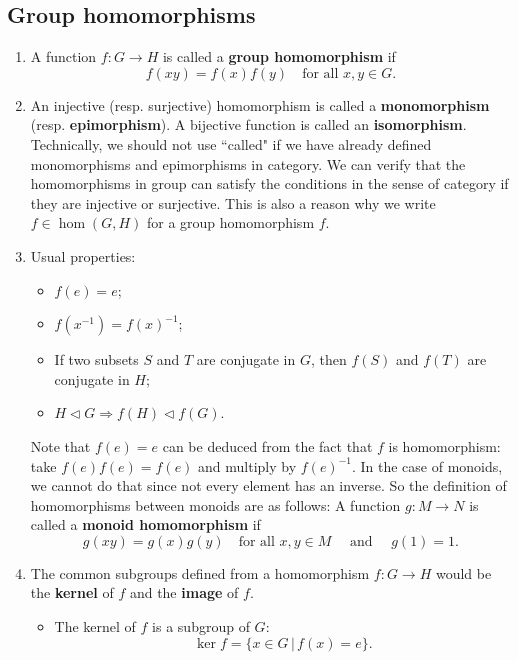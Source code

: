 \subsection*{Group homomorphisms}
\begin{enumerate}[(1)]
	\item A function $f:G\rightarrow H$ is called a \textbf{group homomorphism} if 
	\begin{equation*}
		f(xy) = f(x)f(y)\quad\text{for all }x,y\in G.
	\end{equation*}
	\item An injective (resp. surjective) homomorphism is called a \textbf{monomorphism} (resp. \textbf{epimorphism}). A bijective function is called an \textbf{isomorphism}. Technically, we should not use ``called" if we have already defined monomorphisms and epimorphisms in category. We can verify that the homomorphisms in group can satisfy the conditions in the sense of category if they are injective or surjective. This is also a reason why we write $f\in\operatorname{hom}(G,H)$ for a group homomorphism $f$.
	\item Usual properties:
	\begin{itemize}
		\item $f(e) = e$;
		\item $f(x^{-1})  =f(x)^{-1}$;
		\item If two subsets $S$ and $T$ are conjugate in $G$, then $f(S)$ and $f(T)$ are conjugate in $H$;
		\item $H\lhd G\Rightarrow f(H)\lhd f(G)$.
	\end{itemize}Note that $f(e)=e$ can be deduced from the fact that $f$ is homomorphism: take $f(e)f(e) = f(e)$ and multiply by $f(e)^{-1}$. In the case of monoids, we cannot do that since not every element has an inverse. So the definition of homomorphisms between monoids are as follows: A function $g:M\rightarrow N$ is called a \textbf{monoid homomorphism} if
	\begin{equation*}
		g(xy) = g(x)g(y)\quad \text{for all }x,y\in M\quad \text{ and } \quad  g(1) = 1.
	\end{equation*}
	\item The common subgroups defined from a homomorphism $f:G\rightarrow H$ would be the \textbf{kernel} of $f$ and the \textbf{image} of $f$.
	\begin{itemize}
		\item The kernel of $f$ is a subgroup of $G$:
		\begin{equation*}
			\operatorname{ker} f = \{x\in G\,|\, f(x)=e\}.

\end{equation*}
\end{itemize}
\end{enumerate}
